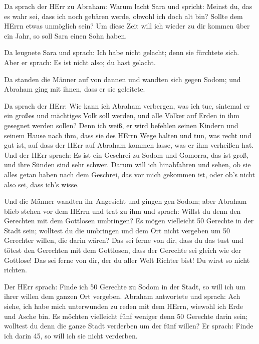  Da sprach der HErr zu Abraham: Warum lacht Sara und
spricht: Meinst du, das es wahr sei, dass ich noch gebären werde, obwohl
ich doch alt bin?  Sollte dem HErrn etwas unmöglich sein?
Um diese Zeit will ich wieder zu dir kommen über ein Jahr, so soll Sara
einen Sohn haben.

 Da leugnete Sara und sprach: Ich habe nicht gelacht; denn
sie fürchtete sich. Aber er sprach: Es ist nicht also; du hast gelacht.

 Da standen die Männer auf von dannen und wandten sich
gegen Sodom; und Abraham ging mit ihnen, dass er sie geleitete.

 Da sprach der HErr: Wie kann ich Abraham verbergen, was
ich tue,  sintemal er ein großes und mächtiges Volk soll
werden, und alle Völker auf Erden in ihm gesegnet werden sollen?
 Denn ich weiß, er wird befehlen seinen Kindern und seinem
Hause nach ihm, dass sie des HErrn Wege halten und tun, was recht und
gut ist, auf dass der HErr auf Abraham kommen lasse, was er ihm
verheißen hat.  Und der HErr sprach: Es ist ein Geschrei zu
Sodom und Gomorra, das ist groß, und ihre Sünden sind sehr schwer.
 Darum will ich hinabfahren und sehen, ob sie alles getan
haben nach dem Geschrei, das vor mich gekommen ist, oder ob's nicht also
sei, dass ich's wisse.

 Und die Männer wandten ihr Angesicht und gingen gen Sodom;
aber Abraham blieb stehen vor dem HErrn  und trat zu ihm
und sprach: Willst du denn den Gerechten mit dem Gottlosen umbringen?
 Es mögen vielleicht 50 Gerechte in der Stadt sein;
wolltest du die umbringen und dem Ort nicht vergeben um 50 Gerechter
willen, die darin wären?  Das sei ferne von dir, dass du
das tust und tötest den Gerechten mit dem Gottlosen, dass der Gerechte
sei gleich wie der Gottlose! Das sei ferne von dir, der du aller Welt
Richter bist! Du wirst so nicht richten.

 Der HErr sprach: Finde ich 50 Gerechte zu Sodom in der
Stadt, so will ich um ihrer willen dem ganzen Ort vergeben.
 Abraham antwortete und sprach: Ach siehe, ich habe mich
unterwunden zu reden mit dem HErrn, wiewohl ich Erde und Asche bin.
 Es möchten vielleicht fünf weniger denn 50 Gerechte darin
sein; wolltest du denn die ganze Stadt verderben um der fünf willen? Er
sprach: Finde ich darin 45, so will ich sie nicht verderben.

